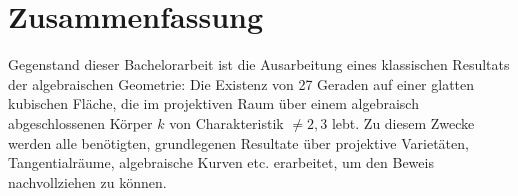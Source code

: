 \documentclass[12pt,a4paper,twoside]{article}
\begin{document}
\pagestyle{empty}


\section*{Zusammenfassung}

Gegenstand dieser Bachelorarbeit ist die Ausarbeitung eines klassischen Resultats der algebraischen Geometrie: Die Existenz von 27 Geraden auf einer glatten kubischen Fläche, die im projektiven Raum über einem algebraisch abgeschlossenen Körper $k$ von Charakteristik $\neq 2,3$ lebt.
Zu diesem Zwecke werden alle benötigten, grundlegenen Resultate über projektive Varietäten, Tangentialräume, algebraische Kurven etc. erarbeitet, um den Beweis nachvollziehen zu können.

\newpage
\tableofcontents
\newpage

\pagestyle{headings}


% 
















\end{document}
